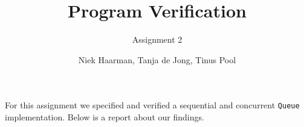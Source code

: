 \documentclass{scrartcl}
\title{Program Verification}
\subtitle{Assignment 2}
\author{Niek Haarman, Tanja de Jong, Tinus Pool}
\begin{document}
	
	\maketitle

For this assignment we specified and verified a sequential and concurrent \texttt{Queue} implementation. Below is a report about our findings.
	
	
	
	
	
\end{document}
